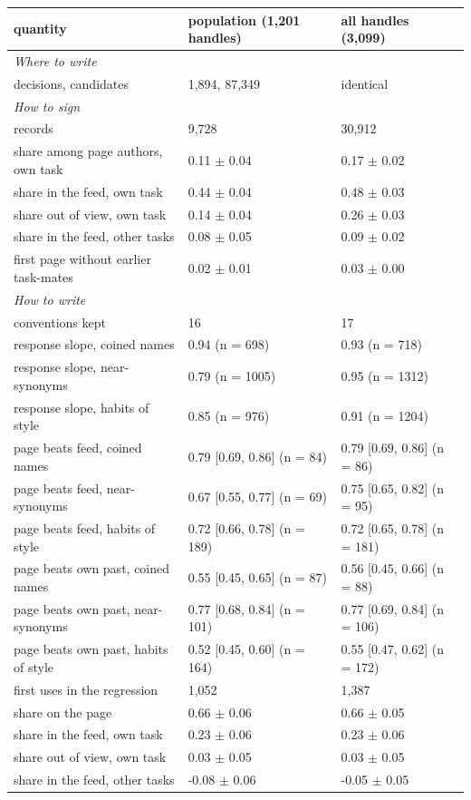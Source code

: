 \begin{tabular}{lll}
\toprule
quantity & population (1,201 handles) & all handles (3,099) \\
\midrule
\multicolumn{3}{l}{\emph{Where to write}} \\
decisions, candidates & 1,894, 87,349 & identical \\
\multicolumn{3}{l}{\emph{How to sign}} \\
records & 9,728 & 30,912 \\
share among page authors, own task & 0.11 $\pm$ 0.04 & 0.17 $\pm$ 0.02 \\
share in the feed, own task & 0.44 $\pm$ 0.04 & 0.48 $\pm$ 0.03 \\
share out of view, own task & 0.14 $\pm$ 0.04 & 0.26 $\pm$ 0.03 \\
share in the feed, other tasks & 0.08 $\pm$ 0.05 & 0.09 $\pm$ 0.02 \\
first page without earlier task-mates & 0.02 $\pm$ 0.01 & 0.03 $\pm$ 0.00 \\
\multicolumn{3}{l}{\emph{How to write}} \\
conventions kept & 16 & 17 \\
response slope, coined names & 0.94 (n = 698) & 0.93 (n = 718) \\
response slope, near-synonyms & 0.79 (n = 1005) & 0.95 (n = 1312) \\
response slope, habits of style & 0.85 (n = 976) & 0.91 (n = 1204) \\
page beats feed, coined names & 0.79 [0.69, 0.86] (n = 84) & 0.79 [0.69, 0.86] (n = 86) \\
page beats feed, near-synonyms & 0.67 [0.55, 0.77] (n = 69) & 0.75 [0.65, 0.82] (n = 95) \\
page beats feed, habits of style & 0.72 [0.66, 0.78] (n = 189) & 0.72 [0.65, 0.78] (n = 181) \\
page beats own past, coined names & 0.55 [0.45, 0.65] (n = 87) & 0.56 [0.45, 0.66] (n = 88) \\
page beats own past, near-synonyms & 0.77 [0.68, 0.84] (n = 101) & 0.77 [0.69, 0.84] (n = 106) \\
page beats own past, habits of style & 0.52 [0.45, 0.60] (n = 164) & 0.55 [0.47, 0.62] (n = 172) \\
first uses in the regression & 1,052 & 1,387 \\
share on the page & 0.66 $\pm$ 0.06 & 0.66 $\pm$ 0.05 \\
share in the feed, own task & 0.23 $\pm$ 0.06 & 0.23 $\pm$ 0.06 \\
share out of view, own task & 0.03 $\pm$ 0.05 & 0.03 $\pm$ 0.05 \\
share in the feed, other tasks & -0.08 $\pm$ 0.06 & -0.05 $\pm$ 0.05 \\
\bottomrule
\end{tabular}
